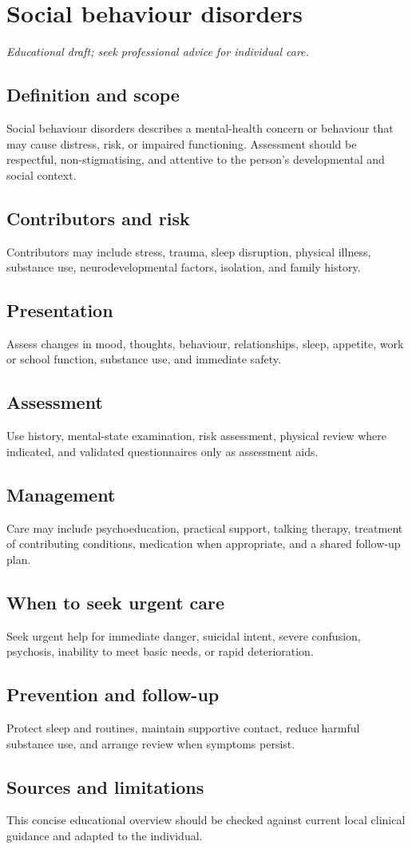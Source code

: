 \chapter{Social behaviour disorders}
\medskip
\noindent\textit{Educational draft; seek professional advice for individual care.}

\section*{Definition and scope}
Social behaviour disorders describes a mental-health concern or behaviour that may cause distress, risk, or impaired functioning. Assessment should be respectful, non-stigmatising, and attentive to the person’s developmental and social context.

\section*{Contributors and risk}
Contributors may include stress, trauma, sleep disruption, physical illness, substance use, neurodevelopmental factors, isolation, and family history.

\section*{Presentation}
Assess changes in mood, thoughts, behaviour, relationships, sleep, appetite, work or school function, substance use, and immediate safety.

\section*{Assessment}
Use history, mental-state examination, risk assessment, physical review where indicated, and validated questionnaires only as assessment aids.

\section*{Management}
Care may include psychoeducation, practical support, talking therapy, treatment of contributing conditions, medication when appropriate, and a shared follow-up plan.

\section*{When to seek urgent care}
Seek urgent help for immediate danger, suicidal intent, severe confusion, psychosis, inability to meet basic needs, or rapid deterioration.

\section*{Prevention and follow-up}
Protect sleep and routines, maintain supportive contact, reduce harmful substance use, and arrange review when symptoms persist.

\section*{Sources and limitations}
This concise educational overview should be checked against current local clinical guidance and adapted to the individual.
